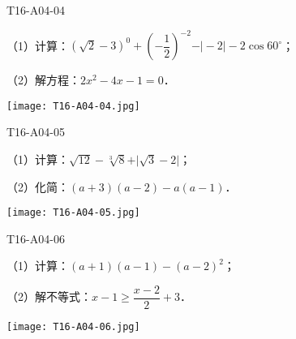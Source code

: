 \begin{defproblem}{T16-A04-04}%
\begin{onlyproblem}%

（1）计算：$(\sqrt 2 -3)^0+\left(-\dfrac{1}{2}\right)^{-2}-\vert -2\vert -2\cos 60^{\circ}$；


（2）解方程：$2x^{2}-4x-1=0$．
\end{onlyproblem}%
\begin{onlysolution}%
\begin{center}
\texttt{[image: T16-A04-04.jpg]}
\end{center}
\end{onlysolution}%
\end{defproblem}


\begin{defproblem}{T16-A04-05}%
\begin{onlyproblem}%
（1）计算：$\sqrt{12}-\sqrt[3]{8}+\vert \sqrt 3 -2\vert $；


（2）化简：$(a+3)(a-2)-a(a-1)$．
\end{onlyproblem}%
\begin{onlysolution}%
\begin{center}
\texttt{[image: T16-A04-05.jpg]}
\end{center}
\end{onlysolution}%
\end{defproblem}


\begin{defproblem}{T16-A04-06}%
\begin{onlyproblem}%
（1）计算：$(a+1)(a-1)-(a-2)^{2}$；


（2）解不等式：$x-1\ge \dfrac{x-2}{2}+3$．
\end{onlyproblem}%
\begin{onlysolution}%
\begin{center}
\texttt{[image: T16-A04-06.jpg]}
\end{center}
\end{onlysolution}%
\end{defproblem}

